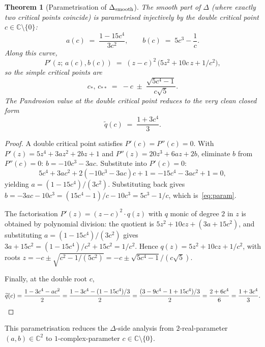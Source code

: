 \documentclass[11pt,a4paper]{article}
\newtheorem{theorem}{Theorem}[section]
\begin{document}
\begin{theorem}[Parametrisation of $\Delta_{\rm smooth}$]
\label{thm:param}
The smooth part of $\Delta$ (where exactly two critical points coincide)
is parametrised injectively by the double critical point $c \in
\mathbb{C}\setminus\{0\}$:
\begin{equation}
\boxed{\;
a(c) \;=\; \frac{1 - 15 c^4}{3 c^2},
\qquad
b(c) \;=\; 5 c^3 - \frac{1}{c}.
\;}
\label{eq:param}
\end{equation}
Along this curve,
\begin{equation}
P'(z;\,a(c),b(c)) \;=\; (z-c)^2\,\bigl(5 z^2 + 10 c\,z + 1/c^2\bigr),
\end{equation}
so the simple critical points are
\begin{equation}
c_*,\,c_{**} \;=\; -c \;\pm\; \frac{\sqrt{5 c^4 - 1}}{c\sqrt{5}}.
\end{equation}
The Pandrosion value at the double critical point reduces to the very
clean closed form
\begin{equation}
\boxed{\;
\widetilde q(c) \;=\; \frac{1 + 3 c^4}{3}.
\;}
\label{eq:qtil-double}
\end{equation}
\end{theorem}

\begin{proof}
A double critical point satisfies $P'(c)=P''(c)=0$. With
$P'(z) = 5 z^4 + 3 a z^2 + 2 b z + 1$ and
$P''(z) = 20 z^3 + 6 a z + 2 b$, eliminate $b$ from $P''(c)=0$:
$b = -10 c^3 - 3 a c$. Substitute into $P'(c)=0$:
\[
5 c^4 + 3 a c^2 + 2(-10 c^3 - 3 a c) c + 1 = -15 c^4 - 3 a c^2 + 1 = 0,
\]
yielding $a = (1-15 c^4)/(3 c^2)$. Substituting back gives
$b = -3 a c - 10 c^3 = (15 c^4 -1)/c - 10 c^3 = 5 c^3 - 1/c$,
which is~\eqref{eq:param}.

The factorisation $P'(z) = (z-c)^2 \cdot q(z)$ with $q$ monic of degree
$2$ in $z$ is obtained by polynomial division: the quotient is
$5 z^2 + 10 c z + (3a + 15 c^2)$, and substituting $a = (1-15 c^4)/(3 c^2)$
gives $3 a + 15 c^2 = (1-15 c^4)/c^2 + 15 c^2 = 1/c^2$. Hence
$q(z) = 5 z^2 + 10 c z + 1/c^2$, with roots
$z = -c \pm \sqrt{c^2 - 1/(5c^2)} = -c \pm \sqrt{5c^4-1}/(c\sqrt 5)$.

Finally, at the double root $c$,
\[
\widetilde q(c) = \frac{1 - 3 c^4 - a c^2}{2}
= \frac{1 - 3 c^4 - (1-15 c^4)/3}{2}
= \frac{(3 - 9c^4 - 1 + 15 c^4)/3}{2}
= \frac{2 + 6 c^4}{6} = \frac{1 + 3 c^4}{3}.
\qedhere
\]
\end{proof}

This parametrisation reduces the $\Delta$-side analysis from
$2$-real-parameter $(a,b)\in\mathbb{C}^2$ to $1$-complex-parameter
$c\in\mathbb{C}\setminus\{0\}$.
\end{document}
